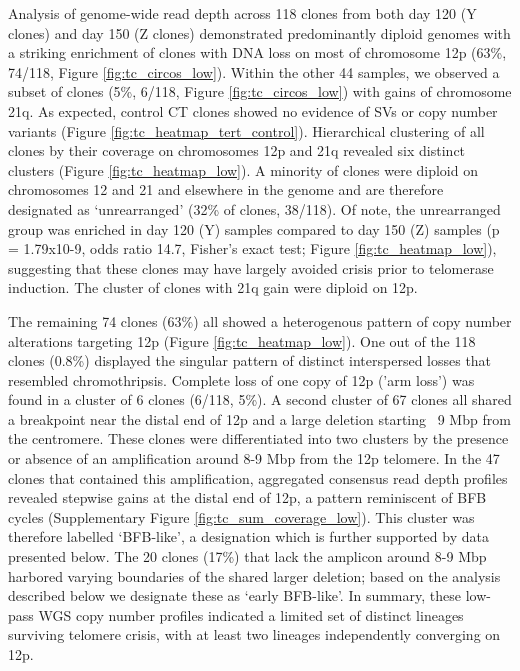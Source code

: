 \documentclass[phd,tocprelim]{cornell}
\begin{document}
Analysis of genome-wide read depth across 118 clones from both day 120 (Y clones) and day 150 (Z clones) demonstrated predominantly diploid genomes with a striking enrichment of clones with DNA loss on most of chromosome 12p (63\%, 74/118, Figure \ref{fig:tc_circos_low}). Within the other 44 samples, we observed a subset of clones (5\%, 6/118, Figure \ref{fig:tc_circos_low}) with gains of chromosome 21q. As expected, control CT clones showed no evidence of SVs or copy number variants (Figure \ref{fig:tc_heatmap_tert_control}). Hierarchical clustering of all clones by their coverage on chromosomes 12p and 21q revealed six distinct clusters (Figure \ref{fig:tc_heatmap_low}). A minority of clones were diploid on chromosomes 12 and 21 and elsewhere in the genome and are therefore designated as ‘unrearranged’ (32\% of clones, 38/118). Of note, the unrearranged group was enriched in day 120 (Y) samples compared to day 150 (Z) samples (p = 1.79x10-9, odds ratio 14.7, Fisher’s exact test; Figure \ref{fig:tc_heatmap_low}), suggesting that these clones may have largely avoided crisis prior to telomerase induction. The cluster of clones with 21q gain were diploid on 12p.

The remaining 74 clones (63\%) all showed a heterogenous pattern of copy number alterations targeting 12p (Figure \ref{fig:tc_heatmap_low}). One out of the 118 clones (0.8\%) displayed the singular pattern of distinct interspersed losses that resembled chromothripsis. Complete loss of one copy of 12p ('arm loss') was found in a cluster of 6 clones (6/118, 5\%). A second cluster of 67 clones all shared a breakpoint near the distal end of 12p and a large deletion starting ~9 Mbp from the centromere. These clones were differentiated into two clusters by the presence or absence of an amplification around 8-9 Mbp from the 12p telomere. In the 47 clones that contained this amplification, aggregated consensus read depth profiles revealed stepwise gains at the distal end of 12p, a pattern reminiscent of BFB cycles (Supplementary Figure \ref{fig:tc_sum_coverage_low}). This cluster was therefore labelled ‘BFB-like’, a designation which is further supported by data presented below. The 20 clones (17\%) that lack the amplicon around 8-9 Mbp harbored varying boundaries of the shared larger deletion; based on the analysis described below we designate these as ‘early BFB-like’. In summary, these low-pass WGS copy number profiles indicated a limited set of distinct lineages surviving telomere crisis, with at least two lineages independently converging on 12p.
\end{document}
